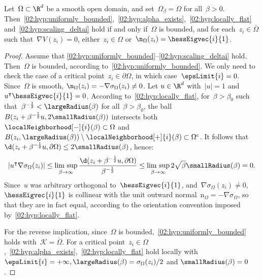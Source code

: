     \begin{lemma}
        \label{02:lemma:geometry_equivalent}
    Let~$\Omega\subset\R^d$ be a smooth open domain, and set~$\Omega_\beta=\Omega$ for all~${\beta>0}$. Then~\eqref{02:hyp:uniformly_bounded},~\eqref{02:hyp:alpha_exists},~\eqref{02:hyp:locally_flat} and~\eqref{02:hyp:scaling_deltai} hold if and only if~$\Omega$ is bounded, and for each~$z_i\in\overline\Omega$ such that~$\nabla V(z_i)=0$, either~$z_i\in\Omega$ or~$\n_\Omega(z_i)=\hessEigvec{i}{1}$.
    \end{lemma}
    \begin{proof}
            Assume that \eqref{02:hyp:uniformly_bounded}--\eqref{02:hyp:scaling_deltai} hold. Then~$\Omega$ is bounded, according to~\eqref{02:hyp:uniformly_bounded}. We only need to check the case of a critical point~$z_i\in\partial\Omega$, in which case~$\epsLimit{i}=0$. Since~$\Omega$ is smooth, $\n_\Omega(z_i) = -\nabla \sigma_{\Omega}(z_i) \neq 0$. Let $u\in\R^d$ with~$|u|=1$ and~$u^\intercal\hessEigvec{i}{1}=0$. According to~\eqref{02:hyp:locally_flat}, for~$\beta>\beta_0$ such that~$\beta^{-\frac12}<\largeRadius(\beta)$ for all~$\beta>\beta_0$, 
            the ball $B(z_i+\beta^{-\frac12}u,2\smallRadius(\beta))$ intersects both~$\localNeighborhood[-]{i}(\beta)\subset \Omega$ and~$B(z_i,\largeRadius(\beta))\setminus \localNeighborhood[+]{i}(\beta)\subset \Omega^c$. It follows that
            $\d(z_i + \beta^{-\frac12}u,\partial\Omega) \leq 2\smallRadius(\beta)$, hence:
            \[ \left|u^\intercal\nabla \sigma_{\Omega}(z_i)\right| \leq \underset{\beta\to\infty}{\lim\,\sup}\,\frac{\d(z_i+\beta^{-\frac12}u,\partial\Omega)}{\beta^{-\frac12}} \leq \underset{\beta\to\infty}{\lim\,\sup}\,2\sqrt\beta\smallRadius(\beta)=0.\]
            Since~$u$ was arbitrary orthogonal to~$\hessEigvec{i}{1}$, and~$\nabla\sigma_{\Omega}(z_i)\neq 0$,~$\hessEigvec{i}{1}$ is collinear with the unit outward normal~$\mathrm{n}_{\Omega}= -\nabla \sigma_{\Omega}$, so that they are in fact equal, according to the orientation convention imposed by~\eqref{02:hyp:locally_flat}.

            For the reverse implication, since~$\Omega$ is bounded,~\eqref{02:hyp:uniformly_bounded} holds with~$\mathcal K = \overline \Omega$. For a critical point~$z_i\in\Omega$,~\eqref{02:hyp:alpha_exists},~\eqref{02:hyp:locally_flat} hold locally with~$\epsLimit{i}=+\infty,\largeRadius(\beta) = \sigma_\Omega(z_i)/2$ and $\smallRadius(\beta)=0$.
            

\end{proof}
